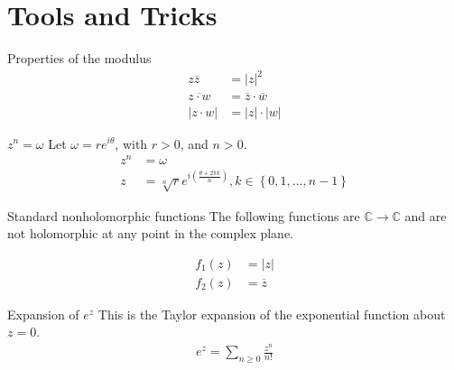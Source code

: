 \documentclass{article}
\begin{document}

\tableofcontents

\newpage

\section{Tools and Tricks}
\begin{misc}{Properties of the modulus}{}
    \begin{align*}
        z\overline{z} &= \left\lvert z \right\rvert ^{2} \\
        \overline{z\cdot w}&= \overline{z} \cdot \overline{w}  \\
        \left\lvert z\cdot w \right\rvert &= \left\lvert z \right\rvert \cdot \left\lvert w \right\rvert 
    \end{align*}
    
    \end{misc}
    
    \begin{misc}{\( z^n = \omega  \) }{}
    Let \( \omega = re^{i \theta } \), with \( r>0 \), and \( n>0 \).
    \begin{align*}
        z^n &= \omega \\
        z &= \sqrt[n]{r} e^{i (\frac{\theta + 2\pi k}{n}) }, k \in \left\{ 0,1, \dots , n - 1 \right\} 
    \end{align*}
    
    \end{misc}
    
    \begin{misc}{Standard nonholomorphic functions}{}
    The following functions are \( \mathbb{C} \to \mathbb{C}  \) and are not holomorphic at any point in the complex plane. 
    
    \begin{align*}
        f_1(z) &= |z|\\
        f_2(z) &= \overline{z} 
    \end{align*}
    
    \end{misc}
    
    \begin{misc}{Expansion of \( e^z \) }{}
        This is the Taylor expansion of the exponential function about \( z = 0 \).  
    \begin{align*}
        e^z = \sum_{n \geq 0} \frac{z^n}{n!}
    \end{align*}
    
    \end{misc}
    
\end{document}
